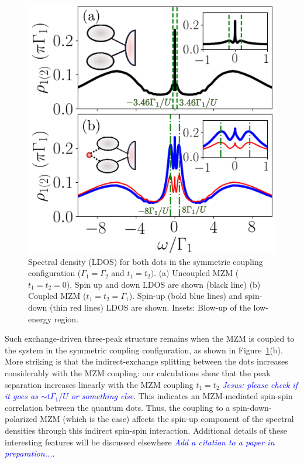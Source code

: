\documentclass[showpacs,aps,prb,reprint,superscriptaddress]{revtex4-1}
\newcommand{\LUIS}[1]{\textcolor{blue}{\fbox{Luis} {\sl#1}}}
\begin{document}
        \begin{figure}[bt]
        \begin{center}
        \includegraphics[width=1.0\columnwidth]{Graficos/NRG_t1zero_t1eqt2.png}
        \caption{  \label{fig:NRG_Majorana} Spectral density (LDOS) for both dots in the symmetric coupling configuration ($\Gamma_1\!=\!\Gamma_2$ and $t_1\!=\!t_2)$.  (a) Uncoupled MZM ($t_1\!=\!t_2\!=\!0$). Spin up and down LDOS are shown (black line) (b) Coupled MZM ($t_1\!=\!t_2\!=\!\Gamma_1$). Spin-up (bold blue lines) and  spin-down (thin red lines) LDOS are shown. Insets: Blow-up of the low-energy region. 
        }
        \end{center}
        \end{figure}

Such exchange-driven three-peak structure remains when the MZM is coupled to the system in the symmetric coupling configuration, as shown in Figure\ \ref{fig:NRG_Majorana}(b). More striking is that the indirect-exchange splitting between the dots increases considerably with the MZM coupling: our calculations show that the peak separation increases linearly with the MZM coupling $t_1\!=\!t_2$ \LUIS{Jesus: please check if it goes as $\sim t \Gamma_1/U$ or something else}. This indicates an MZM-mediated spin-spin correlation between the quantum dots. Thus, the coupling to a spin-down-polarized MZM (which is the case) affects the spin-up component of the spectral densities through this indirect spin-spin interaction. Additional details of these interesting features will be discussed elsewhere \LUIS{Add a citation to a paper in preparation...}.
\end{document}
